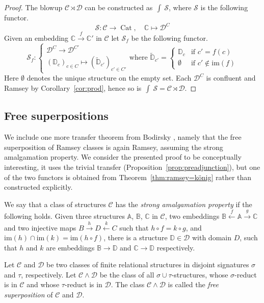 \documentclass[preprint,12pt]{elsarticle}
\newcommand{\cat}[1]{\mathcal{#1}}
\newcommand{\str}[1]{\mathbb{#1}}
\DeclareMathOperator{\Cat}{Cat}
\DeclareMathOperator{\Elts}{\int\!}
\begin{document}
\begin{proof}
    The blowup $\cat C\rtimes\cat D$ can be constructed as $\Elts\cat S$, where $\cat S$ is the following functor.
    $$
    \cat S:\cat C\to\Cat , \quad\str C\mapsto \cat D^{C}
    $$
    Given an embedding $\str C\xrightarrow{f}\str C'$ in $\cat C$ let $\cat S_f$ be the following functor.
    $$
    \cat S_f : 
    \begin{cases}
        \cat D^C\to\cat D^{C'} \\
        (\str D_c)_{c\in C} \mapsto (\tilde{\str D}_{c'})_{c'\in C'}   
    \end{cases} \text{where }
    \tilde{\str D}_{c'} = 
    \begin{cases}
    \str D_c &\text{if } c'=f(c)\\
    \emptyset &\text{if }c'\notin \mathrm{im}(f)
    \end{cases}
    $$
    Here $\emptyset$ denotes the unique structure on the empty set.
    Each $\cat D^{C}$ is confluent and Ramsey by Corollary~\ref{cor:prod}, hence so is $\Elts\cat S=\cat C\rtimes\cat D$.
\end{proof}



\subsection{Free superpositions}
We include one more transfer theorem from Bodirsky \cite{bodirsky2012transfers}, namely that the free superposition of Ramsey classes is again Ramsey, assuming the strong amalgamation property. We consider the presented proof to be conceptually interesting, it uses the trivial transfer (Proposition~\ref{prop:preadjunction}), but one of the two functors is obtained from Theorem~\ref{thm:ramsey=könig} rather than constructed explicitly.
\begin{defin}
    We say that a class of structures $\cat C$ has the \emph{strong amalgamation property} if the following holds. Given three structures $\str A$, $\str B$, $\str C$ in $\cat C$, two embeddings $\str B\xleftarrow{f}\str A\xrightarrow{g}\str C$ and two injective maps $ B\xrightarrow{h}D\xleftarrow{k}C$ such that $h\circ f= k\circ g$, and $\mathrm{im}(h)\cap\mathrm{im}(k) = \mathrm{im}(h\circ f)$, there is a structure $\str D\in\cat D$ with domain $D$, such that $h$ and $k$ are embeddings $\str B\to \str D$ and $\str C\to\str D$ respectively.
\end{defin}

\begin{defin}
    Let $\cat C$ and $\cat D$ be two classes of finite relational structures in disjoint signatures $\sigma$ and $\tau$, respectively. Let $\cat C\wedge\cat D$ be the class of all $\sigma\cup\tau$-structures, whose $\sigma$-reduct is in $\cat C$ and whose $\tau$-reduct is in $\cat D$. The class $\cat C\wedge\cat D$ is called the \emph{free superposition} of $\cat C$ and $\cat D$.
\end{defin}
\end{document}
